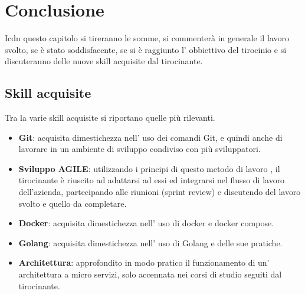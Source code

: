 \documentclass[a4paper,12pt,titlepage,italian,openany]{report}
\begin{document}
\chapter{Conclusione}
Icdn questo capitolo si tireranno le somme, si commenterà in generale il lavoro svolto, se è stato soddisfacente, se si è raggiunto l' obbiettivo del tirocinio e si discuteranno delle nuove skill acquisite dal tirocinante.
\section{Skill acquisite}
Tra la varie skill acquisite si riportano quelle più rilevanti.
\begin{itemize}
    \item[] \textbf{Git}: acquisita dimestichezza nell' uso dei comandi Git, e quindi anche di lavorare in un ambiente di sviluppo condiviso con più sviluppatori.
    \item[] \textbf{Sviluppo AGILE}: utilizzando i principi di questo metodo di lavoro , il tirocinante è riuscito ad adattarsi ad essi ed integrarsi nel flusso di lavoro dell'azienda, partecipando alle riunioni (sprint review) e discutendo del lavoro svolto e quello da completare.
    \item[] \textbf{Docker}: acquisita dimestichezza nell' uso di docker e docker compose.
    \item[] \textbf{Golang}: acquisita dimestichezza nell' uso di Golang e delle sue pratiche.
    \item[] \textbf{Architettura}: approfondito in modo pratico il funzionamento di un' architettura a micro servizi, solo accennata nei corsi di studio seguiti dal tirocinante.
    
\end{itemize}
\end{document}
